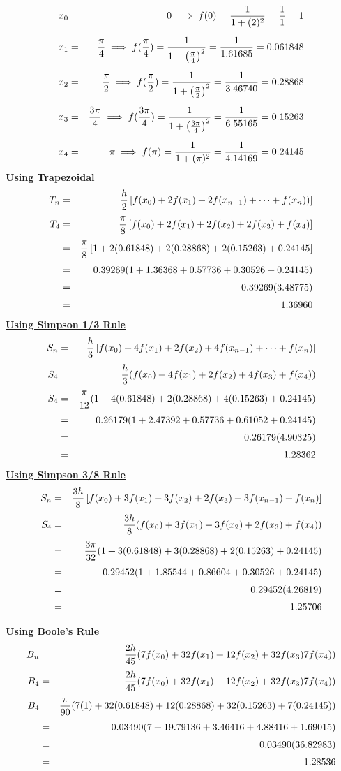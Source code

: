 \documentclass[12pt]{report}
\newcommand{\ubt}[1]{\textbf{\underline{#1}}}
\newcommand{\sps}{\\[0.2cm]}
\newcommand{\spn}[1]{\\[#1cm]}
\begin{document}
	\begin{eqnarray}
		x_0 &=& 0 \implies f(0) = \frac{1}{1+(2)^2} = \frac{1}{1} = 1\notag\sps
		x_1 &=& \frac{\pi}{4} \implies f(\frac{\pi}{4}) = \frac{1}{1+\left(\frac{\pi}{4}\right)^2} = \frac{1}{1.61685} = 0.061848\notag\sps
		x_2 &=& \frac{\pi}{2} \implies f(\frac{\pi}{2}) = \frac{1}{1 + \left(\frac{\pi}{2}\right)^2} = \frac{1}{3.46740} = 0.28868 \notag\sps
		x_3 &=& \frac{3\pi}{4} \implies f(\frac{3\pi}{4}) = \frac{1}{1 + \left(\frac{3\pi}{4}\right)^2} = \frac{1}{6.55165} = 0.15263\notag\sps
		x_4 &=& \pi \implies f(\pi) = \frac{1}{1+(\pi)^2} = \frac{1}{4.14169} = 0.24145\notag
	\end{eqnarray}
	\ubt{Using Trapezoidal}
	\begin{eqnarray}
		T_n &=& \frac{h}{2}\left[f(x_0) + 2f(x_1) + 2f(x_{n-1}) + \cdots + f(x_n))\right]\notag\spn{0.1}
		T_4 &=& \frac{\pi}{8}\left[f(x_0)+2f(x_1) + 2f(x_2)+2f(x_3) + f(x_4)\right]\notag\spn{0.1}
		&=& \frac{\pi}{8}\left[1+2(0.61848) + 2(0.28868)+2(0.15263)+0.24145\right]\notag\spn{0.1}
		&=&0.39269(1+1.36368+0.57736+0.30526+0.24145)\notag\spn{0.1}
		&=&0.39269(3.48775)\notag\spn{0.1}
		&=&1.36960\notag
	\end{eqnarray}
	\ubt{Using Simpson 1/3 Rule}
	\begin{eqnarray}
		S_n &=& \frac{h}{3}\left[f(x_0)+4f(x_1)+2f(x_2)+4f(x_{n-1}) + \cdots + f(x_n)\right]\notag\spn{0.1}
		S_4 &=& \frac{h}{3}(f(x_0) + 4f(x_1) + 2f(x_2) + 4f(x_3) + f(x_4))\notag\spn{0.1}
		S_4 &=& \frac{\pi}{12}(1 + 4(0.61848) + 2(0.28868) + 4(0.15263)+0.24145)\notag\spn{0.1}
		&=& 0.26179(1+2.47392 + 0.57736 + 0.61052 + 0.24145)\notag\spn{0.1}
		&=& 0.26179(4.90325)\notag\spn{0.1}
		&=& 1.28362\notag 
	\end{eqnarray}
	\ubt{Using Simpson 3/8 Rule}
	\begin{eqnarray}
		S_n &=& \frac{3h}{8}\left[f(x_0)+3f(x_1) + 3f(x_2) + 2f(x_3) + 3f(x_{n-1}) + f(x_n)\right]\notag\spn{0.1}
		S_4 &=& \frac{3h}{8}(f(x_0) + 3f(x_1) + 3f(x_2) + 2f(x_3) + f(x_4)) \notag\spn{0.1}
		&=&\frac{3\pi}{32}(1+3(0.61848)+3(0.28868)+2(0.15263)+0.24145)\notag\spn{0.1}
		&=&0.29452(1+1.85544+0.86604 +0.30526+0.24145)\notag\spn{0.1}
		&=&0.29452(4.26819)\notag\spn{0.1}
		&=& 1.25706\notag
	\end{eqnarray}

	\ubt{Using Boole's Rule}
	\begin{eqnarray}
		B_n &=&  \frac{2h}{45}(7f(x_0) + 32f(x_1)+12f(x_2)+32f(x_3)7f(x_4))\notag\spn{0.1}
		B_4 &=&\frac{2h}{45}(7f(x_0) + 32f(x_1)+12f(x_2)+32f(x_3)7f(x_4))\notag\spn{0.1}
		B_4 &=& \frac{\pi}{90}(7(1)+32(0.61848)+12(0.28868)+32(0.15263)+7(0.24145))\notag\spn{0.1}
		&=& 0.03490(7+19.79136+3.46416+4.88416+1.69015)\notag\spn{0.1}
		&=&0.03490(36.82983)\notag\spn{0.1}
		&=& 1.28536\notag
	\end{eqnarray}
\end{document}
